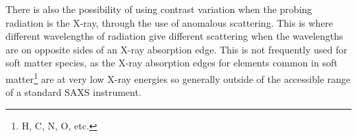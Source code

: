  There is also the possibility of using contrast variation when the probing radiation is the X-ray, through the use of anomalous scattering.
This is where different wavelengths of radiation give different scattering when the wavelengths are on opposite sides of an X-ray absorption edge.
This is not frequently used for soft matter species, as the X-ray absorption edges for elements common in soft matter\footnote{H, C, N, O, etc.} are at very low X-ray energies so generally outside of the accessible range of a standard SAXS instrument.
